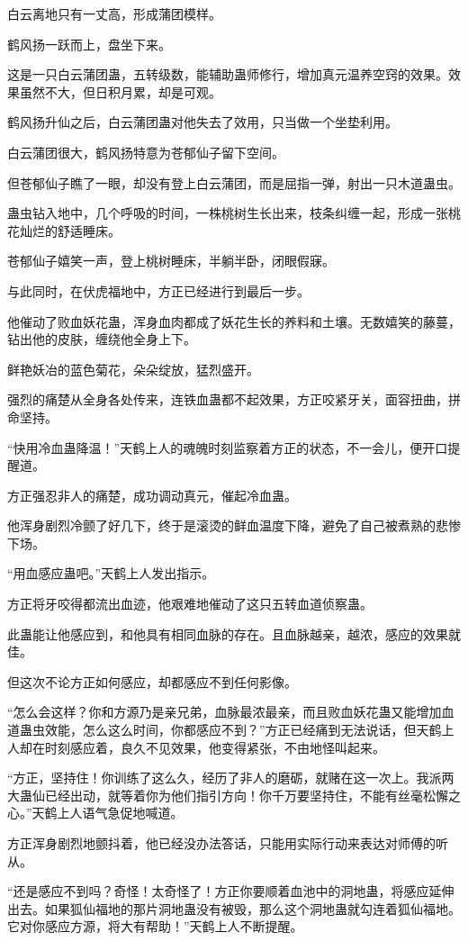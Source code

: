 \begin{this_body}
白云离地只有一丈高，形成蒲团模样。

鹤风扬一跃而上，盘坐下来。

这是一只白云蒲团蛊，五转级数，能辅助蛊师修行，增加真元温养空窍的效果。效果虽然不大，但日积月累，却是可观。

鹤风扬升仙之后，白云蒲团蛊对他失去了效用，只当做一个坐垫利用。

白云蒲团很大，鹤风扬特意为苍郁仙子留下空间。

但苍郁仙子瞧了一眼，却没有登上白云蒲团，而是屈指一弹，射出一只木道蛊虫。

蛊虫钻入地中，几个呼吸的时间，一株桃树生长出来，枝条纠缠一起，形成一张桃花灿烂的舒适睡床。

苍郁仙子嬉笑一声，登上桃树睡床，半躺半卧，闭眼假寐。

与此同时，在伏虎福地中，方正已经进行到最后一步。

他催动了败血妖花蛊，浑身血肉都成了妖花生长的养料和土壤。无数嬉笑的藤蔓，钻出他的皮肤，缠绕他全身上下。

鲜艳妖冶的蓝色菊花，朵朵绽放，猛烈盛开。

强烈的痛楚从全身各处传来，连铁血蛊都不起效果，方正咬紧牙关，面容扭曲，拼命坚持。

“快用冷血蛊降温！”天鹤上人的魂魄时刻监察着方正的状态，不一会儿，便开口提醒道。

方正强忍非人的痛楚，成功调动真元，催起冷血蛊。

他浑身剧烈冷颤了好几下，终于是滚烫的鲜血温度下降，避免了自己被煮熟的悲惨下场。

“用血感应蛊吧。”天鹤上人发出指示。

方正将牙咬得都流出血迹，他艰难地催动了这只五转血道侦察蛊。

此蛊能让他感应到，和他具有相同血脉的存在。且血脉越亲，越浓，感应的效果就佳。

但这次不论方正如何感应，却都感应不到任何影像。

“怎么会这样？你和方源乃是亲兄弟，血脉最浓最亲，而且败血妖花蛊又能增加血道蛊虫效能，怎么这么时间，你都感应不到？”方正已经痛到无法说话，但天鹤上人却在时刻感应着，良久不见效果，他变得紧张，不由地怪叫起来。

“方正，坚持住！你训练了这么久，经历了非人的磨砺，就赌在这一次上。我派两大蛊仙已经出动，就等着你为他们指引方向！你千万要坚持住，不能有丝毫松懈之心。”天鹤上人语气急促地喊道。

方正浑身剧烈地颤抖着，他已经没办法答话，只能用实际行动来表达对师傅的听从。

“还是感应不到吗？奇怪！太奇怪了！方正你要顺着血池中的洞地蛊，将感应延伸出去。如果狐仙福地的那片洞地蛊没有被毁，那么这个洞地蛊就勾连着狐仙福地。它对你感应方源，将大有帮助！”天鹤上人不断提醒。


\end{this_body}
